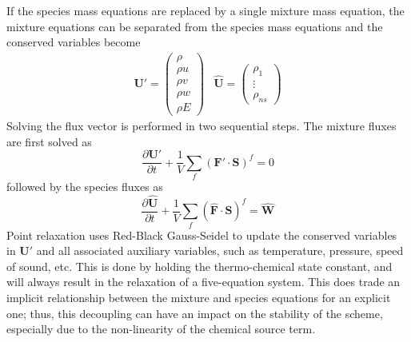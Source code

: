 If the species mass equations are replaced by a single mixture mass equation,
the mixture equations can be separated from the species mass
equations and the conserved variables become
\begin{equation}
	\begin{matrix}
		\mathbf{U}'=\begin{pmatrix}
			\rho \\
			\rho u \\
			\rho v \\
			\rho w \\
			\rho E
		\end{pmatrix} &
		\mathbf{\hat{U}}=\begin{pmatrix}
			\rho_1 \\
			\vdots \\
			\rho_{ns}
		\end{pmatrix}
	\end{matrix}
\end{equation}
Solving the flux vector is performed in two sequential steps.  The mixture
fluxes are first solved as
\begin{equation}
  \frac{\partial \mathbf{{U}'}}{\partial t} +
  \frac{1}{V}\sum\limits_{f}(\mathbf{F}'\cdot\mathbf{S})^f = 0
\end{equation}
followed by the species fluxes as
\begin{equation}
  \frac{\partial \mathbf{\hat{U}}}{\partial t} +
  \frac{1}{V}\sum\limits_{f}(\mathbf{\hat{F}}\cdot\mathbf{S})^f =
  \mathbf{\hat{W}}
\end{equation}
Point relaxation uses Red-Black Gauss-Seidel to update the conserved
variables in $\mathbf{U}'$ and all associated auxiliary variables, such as
temperature, pressure, speed of sound, etc.  This is done by holding the
thermo-chemical state constant, and will always result in the relaxation of a
five-equation system.  This does trade an implicit relationship between the mixture
and species equations for an explicit one; thus, this decoupling can have an
impact on the stability of the scheme, especially due to the non-linearity of
the chemical source term\cite{park}.
 
